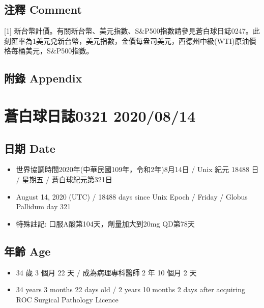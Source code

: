 \documentclass[
]{article}
\providecommand{\tightlist}{%
  \setlength{\itemsep}{0pt}\setlength{\parskip}{0pt}}
\begin{document}
\hypertarget{ux6ce8ux91cb-comment-12}{%
\subsection{注釋 Comment}\label{ux6ce8ux91cb-comment-12}}

{[}1{]}
新台幣計價。有關新台幣、美元指數、S\&P500指數請參見蒼白球日誌0247。此刻匯率為1美元兌新台幣，美元指數，金價每盎司美元，西德州中級(WTI)原油價格每桶美元，S\&P500指數。

\hypertarget{ux9644ux9304-appendix-12}{%
\subsection{附錄 Appendix}\label{ux9644ux9304-appendix-12}}

\hypertarget{ux84bcux767dux7403ux65e5ux8a8c0321-20200814}{%
\section{蒼白球日誌0321
2020/08/14}\label{ux84bcux767dux7403ux65e5ux8a8c0321-20200814}}

\hypertarget{ux65e5ux671f-date-13}{%
\subsection{日期 Date}\label{ux65e5ux671f-date-13}}

\begin{itemize}
\tightlist
\item
  世界協調時間2020年(中華民國109年，令和2年)8月14日 / Unix 紀元 18488 日
  / 星期五 / 蒼白球紀元第321日
\item
  August 14, 2020 (UTC) / 18488 days since Unix Epoch / Friday / Globus
  Pallidum day 321
\item
  特殊註記: 口服A酸第104天，劑量加大到20mg QD第78天
\end{itemize}

\hypertarget{ux5e74ux9f61-age-13}{%
\subsection{年齡 Age}\label{ux5e74ux9f61-age-13}}

\begin{itemize}
\tightlist
\item
  34 歲 3 個月 22 天 / 成為病理專科醫師 2 年 10 個月 2 天
\item
  34 years 3 months 22 days old / 2 years 10 months 2 days after
  acquiring ROC Surgical Pathology Licence
\end{itemize}
\end{document}
